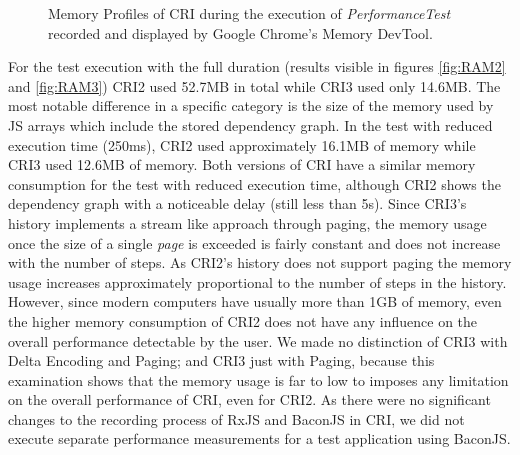 \begin{figure}[!h]
		\hspace{1cm}
		\caption{Memory Profiles of CRI during the execution of \emph{PerformanceTest} recorded and displayed by Google Chrome's Memory DevTool.}
	\end{figure}
	For the test execution with the full duration (results visible in figures \ref{fig:RAM2} and \ref{fig:RAM3}) CRI2 used 52.7MB in total while CRI3 used only 14.6MB. The most notable difference in a specific category is the size of the memory used by JS arrays which include the stored dependency graph. In the test with reduced execution time (250ms), CRI2 used approximately 16.1MB of memory while CRI3 used 12.6MB of memory. Both versions of CRI have a similar memory consumption for the test with reduced execution time, although CRI2 shows the dependency graph with a noticeable delay (still less than 5s). Since CRI3's history implements a stream like approach through paging, the memory usage once the size of a single \emph{page} is exceeded is fairly constant and does not increase with the number of steps. As CRI2's history does not support paging the memory usage increases approximately proportional to the number of steps in the history. However, since modern computers have usually more than 1GB of memory, even the higher memory consumption of CRI2 does not have any influence on the overall performance detectable by the user. We made no distinction of CRI3 with Delta Encoding and Paging; and CRI3 just with Paging, because this examination shows that the memory usage is far to low to imposes any limitation on the overall performance of CRI, even for CRI2. As there were no significant changes to the recording process of RxJS and BaconJS in CRI, we did not execute separate performance measurements for a test application using BaconJS.
	
